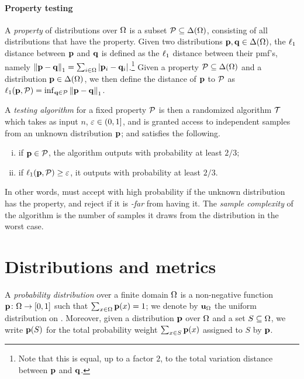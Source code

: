 \paragraph{Property testing}

A \emph{property} of distributions over $\domain[\Omega]$ is a subset $\property\subseteq \distribs{\domain[\Omega]}$, consisting of all distributions that have the property. Given two distributions $\p,\q\in\distribs{\domain[\Omega]}$, the $\lp[1]$ distance between $\p$ and $\q$ is defined as the $\lp[1]$ distance between their pmf's, namely $\normone{\p-\q} = \sum_{i\in\domain[\Omega]} \abs{\p_i-\q_i}$.\footnote{Note that this is equal, up to a factor $2$, to the total variation distance between $\p$ and $\q$.}{} Given a property $\property\subseteq \distribs{\domain[\Omega]}$ and a distribution $\p\in\distribs{\domain[\Omega]}$, we then define the distance of $\p$ to $\property$ as $\lp[1](\p,\property) = \inf_{\q\in\property} \normone{\p-\q}$.

A \emph{testing algorithm} for a fixed property $\property$ is then a randomized algorithm $\Tester$ which takes as input $n$, $\eps\in(0,1]$, and is granted access to independent samples from an unknown distribution $\p$; and satisfies the following.
\begin{enumerate}[(i)]
\item if $\p \in \property$, the algorithm outputs \accept with probability at least $2/3$;
\item if $\lp[1](\p,\property) \geq \eps$, it outputs \reject with probability at least $2/3$.
\end{enumerate}
In other words, \Tester must accept with high probability if the unknown distribution has the property, and reject if it is \emph{\eps-far} from having it. The  \emph{sample complexity} of the algorithm is the number of samples it draws from the distribution in the worst case.

\section{Distributions and metrics} 
A \emph{probability distribution} over a finite domain $\domain$ is a non-negative function $\D\colon\domain\to[0,1]$ such that $\sum_{x\in\domain} \D(x) = 1$; we denote by $\uniform_{\domain}$ the uniform distribution on \domain. Moreover, given a distribution $\D$ over $\domain$ and a set $S\subseteq\domain$, we write $\D(S)$ for the total probability weight $\sum_{x\in S} \D(x)$ assigned to $S$ by $\D$.

